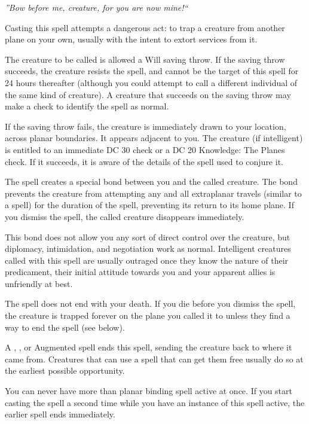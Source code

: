 \emph{''Bow before me, creature, for you are now mine!``}

Casting this spell attempts a dangerous act: to trap a creature from another plane on your own, usually with the intent to extort services from it.

The creature to be called is allowed a Will saving throw.
If the saving throw succeeds, the creature resists the spell, and cannot be the target of this spell for 24 hours thereafter (although you could attempt to call a different individual of the same kind of creature).
A creature that succeeds on the saving throw may make a  check to identify the spell as normal.

If the saving throw fails, the creature is immediately drawn to your location, across planar boundaries.
It appears adjacent to you. 
The creature (if intelligent) is entitled to an immediate DC 30  check or a DC
20 Knowledge: The Planes check. If it succeeds, it is aware of the details of the spell used to conjure it.

The spell creates a special bond between you and the called creature.
The bond prevents the creature from attempting any and all extraplanar travels (similar to a  spell) for the duration of the spell, preventing its return to its home plane. 
If you dismiss the spell, the called creature disappears immediately.

This bond does not allow you any sort of direct control over the creature, but diplomacy, intimidation, and negotiation work as normal. Intelligent creatures called with this spell are usually outraged once they know the nature of their predicament, their initial attitude towards you and your apparent allies is unfriendly at best.

The spell does not end with your death. If you die before you dismiss the spell, the creature is trapped forever on the
plane you called it to unless they find a way to end the spell (see below).

A , , or Augmented  spell ends this spell, sending the creature back to where it came from.
Creatures that can use a spell that can get them free usually do so at the earliest possible opportunity.

You can never have more than planar binding spell active at once. If you start casting the spell a second time while 
you have an instance of this spell active, the earlier spell ends immediately.

